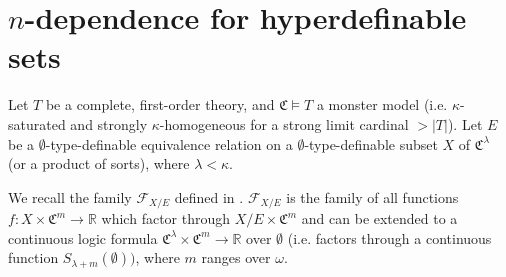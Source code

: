 \documentclass{amsart}
\newtheorem{external claim}[teor]{Claim}
\newcommand{\C}{{\mathfrak C}}
\DeclareMathOperator{\tp}{{tp}}
\begin{document}
\section{$n$-dependence for hyperdefinable sets}\label{section: hyperdef n-dep}


Let $T$ be a complete, first-order theory, and $\C \models T$ a monster model (i.e. $\kappa$-saturated and strongly $\kappa$-homogeneous for a strong limit cardinal $> |T|$). Let $E$ be a $\emptyset$-type-definable equivalence relation on a $\emptyset$-type-definable subset $X$ of $\C^\lambda$ (or a product of sorts), where $\lambda< \kappa$. 




	

We recall the family $\mathcal{F}_{X/E}$ defined in \cite[Section 2]{10.1215/00294527-2022-0023}. $\mathcal{F}_{X/E}$ is the family  of all functions $f : X \times \mathfrak{C}^m \to \mathbb{R}$ which factor through $X/E\times\mathfrak{C}^m$ and can be extended to a continuous logic formula $\C^{\lambda} \times \C^m \to \mathbb{R}$ over $\emptyset$ (i.e. factors through a continuous function $S_{\lambda+m}(\emptyset))$, where $m$ ranges over $\omega$. 

\end{document}
